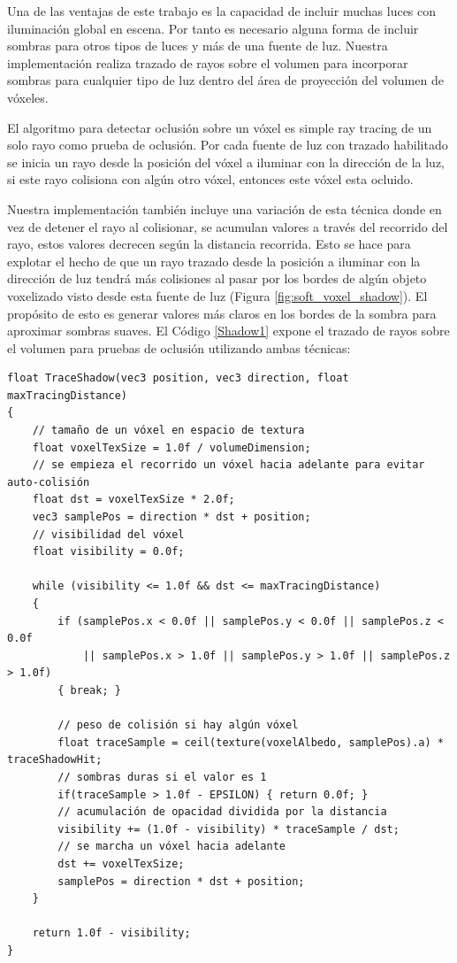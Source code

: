 Una de las ventajas de este trabajo es la capacidad de incluir muchas luces con iluminación global en escena. Por tanto es necesario alguna forma de incluir sombras para otros tipos de luces y más de una fuente de luz. Nuestra implementación realiza trazado de rayos sobre el volumen para incorporar sombras para cualquier tipo de luz dentro del área de proyección del volumen de vóxeles.

El algoritmo para detectar oclusión sobre un vóxel es simple ray tracing de un solo rayo como prueba de oclusión. Por cada fuente de luz con trazado habilitado se inicia un rayo desde la posición del vóxel a iluminar con la dirección de la luz, si este rayo colisiona con algún otro vóxel, entonces este vóxel esta ocluido.

Nuestra implementación también incluye una variación de esta técnica donde en vez de detener el rayo al colisionar, se acumulan valores a través del recorrido del rayo, estos valores decrecen según la distancia recorrida. Esto se hace para explotar el hecho de que un rayo trazado desde la posición a iluminar con la dirección de luz tendrá más colisiones al pasar por los bordes de algún objeto voxelizado visto desde esta fuente de luz (Figura \ref{fig:soft_voxel_shadow}). El propósito de esto es generar valores más claros en los bordes de la sombra para aproximar sombras suaves. El Código \ref{Shadow1} expone el trazado de rayos sobre el volumen para pruebas de oclusión utilizando ambas técnicas:
\\
\begin{lstlisting}[caption={Trazado de rayos sobre volumen albedo para sombras sobre vóxeles}, label=Shadow1]
float TraceShadow(vec3 position, vec3 direction, float maxTracingDistance) 
{
    // tamaño de un vóxel en espacio de textura
    float voxelTexSize = 1.0f / volumeDimension;
    // se empieza el recorrido un vóxel hacia adelante para evitar auto-colisión
    float dst = voxelTexSize * 2.0f;
    vec3 samplePos = direction * dst + position;
    // visibilidad del vóxel
    float visibility = 0.0f;

    while (visibility <= 1.0f && dst <= maxTracingDistance) 
    {
        if (samplePos.x < 0.0f || samplePos.y < 0.0f || samplePos.z < 0.0f
            || samplePos.x > 1.0f || samplePos.y > 1.0f || samplePos.z > 1.0f) 
        { break; }
        
        // peso de colisión si hay algún vóxel
        float traceSample = ceil(texture(voxelAlbedo, samplePos).a) * traceShadowHit;
        // sombras duras si el valor es 1
        if(traceSample > 1.0f - EPSILON) { return 0.0f; }
        // acumulación de opacidad dividida por la distancia
        visibility += (1.0f - visibility) * traceSample / dst;
        // se marcha un vóxel hacia adelante
        dst += voxelTexSize;
        samplePos = direction * dst + position;
    }

    return 1.0f - visibility;
}
\end{lstlisting}

